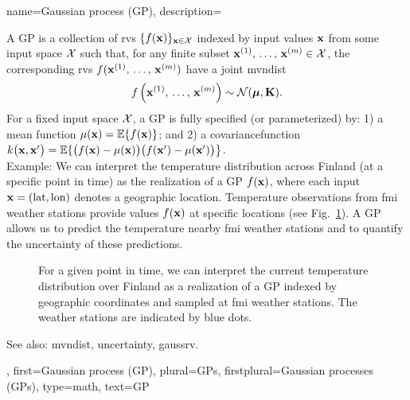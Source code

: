 {name={Gaussian process (GP)},
	description={A GP is a collection of \glspl{rv} 
  		$\{f({\bf x})\}_{{\bf x} \in \mathcal{X}}$ indexed by input values ${\bf x}$ 
  		from some input space $\mathcal{X}$ such that, for any finite subset 
  		${\bf x}^{(1)}, \,\ldots, \,{\bf x}^{(m)} \in \mathcal{X}$, 
  		the corresponding \glspl{rv} $f({\bf x}^{(1)}, \,\ldots, \,{\bf x}^{(m)})$ 
		have a joint \gls{mvndist} 
  		\[
  		f \left( {\bf x}^{(1)}, \,\ldots, \,{\bf x}^{(m)} \right) \sim \mathcal{N}(\boldsymbol{\mu}, \mathbf{K}).
  		\]
  		For a fixed input space $\mathcal{X}$, a GP is 
		fully specified (or parameterized) by: 1) a \gls{mean} \gls{function} 
		$\mu({\bf x}) = \mathbb{E}\{ f({\bf x})\}$; and 2) a \gls{covariancefunction}
		$k\big({\bf x},{\bf x}'\big)= \mathbb{E}\{ \big(f({\bf x})-\mu({\bf x})\big) \big(f({\bf x}')-\mu({\bf x}')\big) \big\}$.\\
  		Example: We can interpret the temperature distribution across Finland (at a specific 
  		point in time) as the \gls{realization} of a GP $f({\bf x})$, where each input 
		${\bf x} = (\text{lat}, \text{lon})$ denotes a geographic location. Temperature 
		observations from \gls{fmi} weather stations provide values $f({\bf x})$ at specific 
		locations (see Fig.\ \ref{fig_gp_FMI_dict}). A GP allows us to predict the temperature 
		nearby \gls{fmi} weather stations and to quantify the \gls{uncertainty} 
  		of these \glspl{prediction}. 
  		\begin{figure}[H]
  		\begin{center}
			\vspace*{-5mm}
		\end{center}
		\caption{For a given point in time, we can interpret the current temperature distribution 
		over Finland as a \gls{realization} of a GP indexed by geographic coordinates and 
		sampled at \gls{fmi} weather stations. The weather stations are indicated by blue dots. \label{fig_gp_FMI_dict}}
		\end{figure}
		See also: \gls{mvndist}, \gls{uncertainty}, \gls{gaussrv}.}, 
  	first={Gaussian process (GP)},
	plural={GPs},
	firstplural={Gaussian processes (GPs)},
  	type=math, 
  	text={GP}
}

